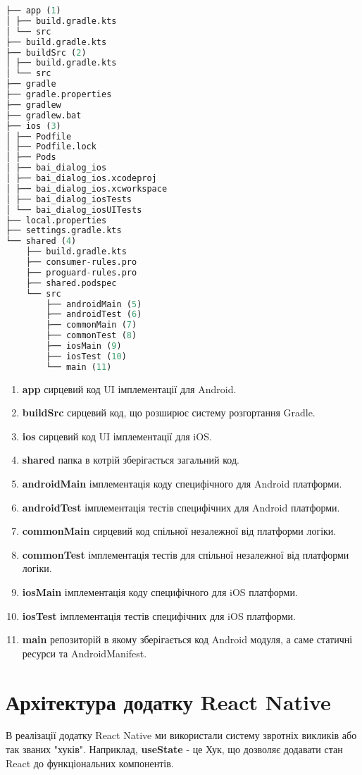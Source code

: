 \begin{lstlisting}[style=light, language=Python,label={lst:kmm_project_layout},caption=KMM Project Layout]
├── app (1)
│ ├── build.gradle.kts
│ └── src
├── build.gradle.kts
├── buildSrc (2)
│ ├── build.gradle.kts
│ └── src
├── gradle
├── gradle.properties
├── gradlew
├── gradlew.bat
├── ios (3)
│ ├── Podfile
│ ├── Podfile.lock
│ ├── Pods
│ ├── bai_dialog_ios
│ ├── bai_dialog_ios.xcodeproj
│ ├── bai_dialog_ios.xcworkspace
│ ├── bai_dialog_iosTests
│ └── bai_dialog_iosUITests
├── local.properties
├── settings.gradle.kts
└── shared (4)
    ├── build.gradle.kts
    ├── consumer-rules.pro
    ├── proguard-rules.pro
    ├── shared.podspec
    └── src
        ├── androidMain (5)
        ├── androidTest (6)
        ├── commonMain (7)
        ├── commonTest (8)
        ├── iosMain (9)
        ├── iosTest (10)
        └── main (11)
\end{lstlisting}

\begin{enumerate}
    \item \textbf{app} сирцевий код UI імплементації для Android.
    \item \textbf{buildSrc} сирцевий код, що розширює систему розгортання Gradle.
    \item \textbf{ios} сирцевий код UI імплементації для iOS.
    \item \textbf{shared} папка в котрій зберігається загальний код.
    \item \textbf{androidMain} імплементація коду специфічного для Android платформи.
    \item \textbf{androidTest} імплементація тестів специфічних для Android платформи.
    \item \textbf{commonMain} сирцевий код спільної незалежної від платформи логіки.
    \item \textbf{commonTest} імплементація тестів для спільної незалежної від платформи логіки.
    \item \textbf{iosMain} імплементація коду специфічного для iOS платформи.
    \item \textbf{iosTest} імплементація тестів специфічних для iOS платформи.
    \item \textbf{main} репозиторій в якому зберігається код Android модуля, а саме статичні ресурси та AndroidManifest.
\end{enumerate}


\section{Архітектура додатку React Native}
\label{section.2.4}
В реалізації додатку React Native ми використали систему звротніх викликів або так званих "хуків".
Наприклад, \textbf{useState} - це Хук, що дозволяє додавати стан React до функціональних компонентів.

